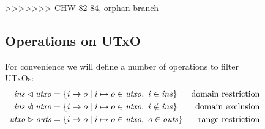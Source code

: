 \documentclass{article}
\newcommand{\restrictdom}{\lhd}
\newcommand{\subtractdom}{\mathbin{\slashed{\restrictdom}}}
\newcommand{\restrictrange}{\rhd}
\theoremstyle{definition}{
  \newtheorem{lemma}{Lemma}[section] %
  \newtheorem{definition}[lemma]{Definition}
}
\theoremstyle{theorem}{
  \newtheorem{invariant}[lemma]{Invariant}
  \newtheorem{proofobligation}[lemma]{Proof Obligation}
}
\numberwithin{equation}{lemma}
\begin{document}
\begin{figure}
>>>>>>> CHW-82-84, orphan branch
\subsection{Operations on UTxO}

For convenience we will define a number of operations to filter UTxOs:
%
\begin{align*}
  \mathit{ins} \restrictdom \mathit{utxo}
& = \{ i \mapsto o \mid i \mapsto o \in \mathit{utxo}, ~ i \in \mathit{ins} \}
& \text{domain restriction}
\\
  \mathit{ins} \subtractdom \mathit{utxo}
& = \{ i \mapsto o \mid i \mapsto o \in \mathit{utxo}, ~ i \notin \mathit{ins} \}
& \text{domain exclusion}
\\
  \mathit{utxo} \restrictrange \mathit{outs}
& = \{ i \mapsto o \mid i \mapsto o \in \mathit{utxo}, ~ o \in \mathit{outs} \}
& \text{range restriction}
\end{align*}


\end{figure}
\end{document}
